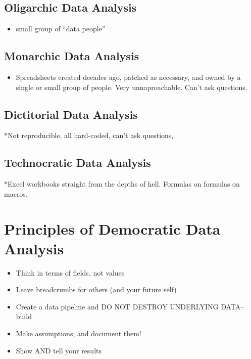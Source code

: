 \documentclass[]{book}
\providecommand{\tightlist}{%
  \setlength{\itemsep}{0pt}\setlength{\parskip}{0pt}}
\begin{document}
\subsection*{Oligarchic Data Analysis}\label{oligarchic-data-analysis}

\begin{itemize}
\tightlist
\item
  small group of ``data people''
\end{itemize}

\subsection*{Monarchic Data Analysis}\label{monarchic-data-analysis}

\begin{itemize}
\tightlist
\item
  Spreadsheets created decades ago, patched as necessary, and owned by a
  single or small group of people. Very unnaproachable. Can't ask
  questions.
\end{itemize}

\subsection*{Dictitorial Data Analysis}\label{dictitorial-data-analysis}

*Not reproducible, all hard-coded, can't ask questions,

\subsection*{Technocratic Data
Analysis}\label{technocratic-data-analysis}

*Excel workbooks straight from the depths of hell. Formulas on formulas
on macros.

\section{Principles of Democratic Data
Analysis}\label{principles-of-democratic-data-analysis}

\begin{itemize}
\tightlist
\item
  Think in terms of fields, not values
\item
  Leave breadcrumbs for others (and your future self)
\item
  Create a data pipeline and DO NOT DESTROY UNDERLYING DATA-- build
\item
  Make assumptions, and document them!
\item
  Show AND tell your results
\end{itemize}
\end{document}
